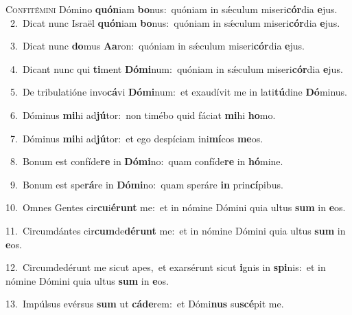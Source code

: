 \lettrine{\initial\textcolor{\initialcolor}{C}}{onfitémini} Dómino \textbf{quón}\-iam \textbf{bo}\-nus:~\star quóniam in sǽculum miseri\-\textbf{cór}\-dia \textbf{e}\-jus.\\
{\numbfont\textcolor{\numbcolor}{~2.}}~Dicat nunc Israël \textbf{quón}\-iam \textbf{bo}\-nus:~\star quóniam in sǽculum miseri\-\textbf{cór}\-dia \textbf{e}\-jus.\par
{\numbfont\textcolor{\numbcolor}{~3.}}~Dicat nunc \textbf{do}\-mus \textbf{A}\-\textbf{a}ron:~\star quóniam in sǽculum miseri\-\textbf{cór}\-dia \textbf{e}\-jus.\par
{\numbfont\textcolor{\numbcolor}{~4.}}~Dicant nunc qui \textbf{ti}\-ment \textbf{Dó}\-\textbf{mi}num:~\star quóniam in sǽculum miseri\-\textbf{cór}\-dia \textbf{e}\-jus.\par
{\numbfont\textcolor{\numbcolor}{~5.}}~De tribulatióne invo\-\textbf{cá}\-vi \textbf{Dó}\-\textbf{mi}num:~\star et exaudívit me in lati\-\textbf{tú}\-dine \textbf{Dó}\-minus.\par
{\numbfont\textcolor{\numbcolor}{~6.}}~Dóminus \textbf{mi}\-hi ad\-\textbf{jú}\-tor:~\star non timébo quid fáciat \textbf{mi}\-hi \textbf{ho}\-mo.\par
{\numbfont\textcolor{\numbcolor}{~7.}}~Dóminus \textbf{mi}\-hi ad\-\textbf{jú}\-tor:~\star et ego despíciam ini\-\textbf{mí}\-cos \textbf{me}\-os.\par
{\numbfont\textcolor{\numbcolor}{~8.}}~Bonum est confíde\textbf{re} in \textbf{Dó}\-\textbf{mi}no:~\star quam confíde\textbf{re} in \textbf{hó}\-mine.\par
{\numbfont\textcolor{\numbcolor}{~9.}}~Bonum est spe\-\textbf{rá}\-re in \textbf{Dó}\-\textbf{mi}no:~\star quam speráre \textbf{in} prin\-\textbf{cí}\-pibus.\par
{\numbfont\textcolor{\numbcolor}{10.}}~Omnes Gentes cir\-\textbf{cu}\-i\-\textbf{é}\-\textbf{runt} me:~\star et in nómine Dómini quia ultus \textbf{sum} in \textbf{e}\-os.\par
{\numbfont\textcolor{\numbcolor}{11.}}~Circumdántes cir\-\textbf{cum}\-de\-\textbf{dé}\-\textbf{runt} me:~\star et in nómine Dómini quia ultus \textbf{sum} in \textbf{e}\-os.\par
{\numbfont\textcolor{\numbcolor}{12.}}~Circumdedérunt me sicut apes,~\dagger et exarsérunt sicut \textbf{i}\-gnis in \textbf{spi}\-nis:~\star et in nómine Dómini quia ultus \textbf{sum} in \textbf{e}\-os.\par
{\numbfont\textcolor{\numbcolor}{13.}}~Impúlsus evérsus \textbf{sum} ut \textbf{cá}\-\textbf{de}rem:~\star et Dómi\textbf{nus} su\-\textbf{scé}\-pit me.\par
